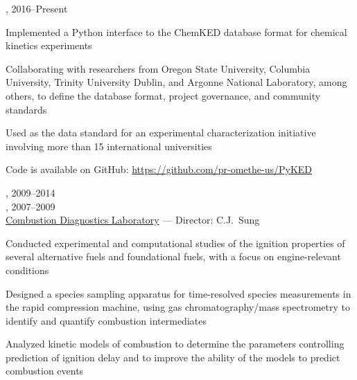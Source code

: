 \vspace{\baselineskip}

,  \hfill 2016--Present

\begin{innerlist}
    \item Implemented a Python interface to the ChemKED database format for chemical kinetics experiments
    \item Collaborating with researchers from Oregon State University, Columbia University, Trinity University Dublin, and Argonne National Laboratory, among others, to define the database format, project governance, and community standards
    \item Used as the data standard for an experimental characterization initiative involving more than 15 international universities
    \item Code is available on GitHub: \url{https://github.com/pr-omethe-us/PyKED}
\end{innerlist}




\vspace{\baselineskip}

,  \hfill 2009--2014\\
,  \hfill 2007--2009\\
\href{http://combdiaglab.engr.uconn.edu}{Combustion Diagnostics Laboratory} --- Director: C.J.\ Sung

\begin{innerlist}
    \item Conducted experimental and computational studies of the ignition
    properties of several alternative fuels and foundational fuels, with
    a focus on engine-relevant conditions
    \item Designed a species sampling apparatus for time-resolved
    species measurements in the rapid compression machine, using gas
    chromatography/mass spectrometry to identify and quantify
    combustion intermediates
    \item Analyzed kinetic models of combustion to determine the parameters
    controlling prediction of ignition delay and to improve the ability of
    the models to predict combustion events
\end{innerlist}

